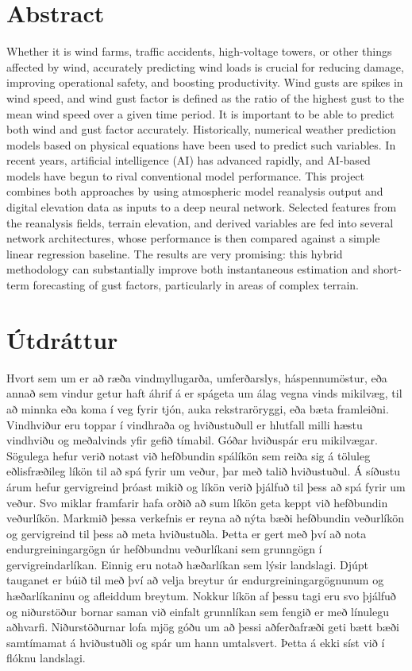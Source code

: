 \documentclass[a4paper,12pt,twoside,BCOR=10mm,openany]{scrbook}
\begin{document}
\section*{Abstract}
Whether it is wind farms, traffic accidents, high-voltage towers, or other things affected by wind, accurately predicting wind loads is crucial for reducing damage, improving operational safety, and boosting productivity. Wind gusts are spikes in wind speed, and wind gust factor is defined as the ratio of the highest gust to the mean wind speed over a given time period. It is important to be able to predict both wind and gust factor accurately. Historically, numerical weather prediction models based on physical equations have been used to predict such variables. In recent years, artificial intelligence (AI) has advanced rapidly, and AI-based models have begun to rival conventional model performance. This project combines both approaches by using atmospheric model reanalysis output and digital elevation data as inputs to a deep neural network. Selected features from the reanalysis fields, terrain elevation, and derived variables are fed into several network architectures, whose performance is then compared against a simple linear regression baseline. The results are very promising: this hybrid methodology can substantially improve both instantaneous estimation and short-term forecasting of gust factors, particularly in areas of complex terrain.
\vfill \vspace*{1cm}

\section*{Útdráttur}
Hvort sem um er að ræða vindmyllugarða, umferðarslys, háspennumöstur, eða annað sem vindur getur haft áhrif á er spágeta um álag vegna vinds mikilvæg, til að minnka eða koma í veg fyrir tjón, auka rekstraröryggi, eða bæta framleiðni. Vindhviður eru toppar í vindhraða og hviðustuðull er hlutfall milli hæstu vindhviðu og meðalvinds yfir gefið tímabil. Góðar hviðuspár eru mikilvægar. Sögulega hefur verið notast við hefðbundin spálíkön sem reiða sig á töluleg eðlisfræðileg líkön til að spá fyrir um veður, þar með talið hviðustuðul. Á síðustu árum hefur gervigreind þróast mikið og líkön verið þjálfuð til þess að spá fyrir um veður. Svo miklar framfarir hafa orðið að sum líkön geta keppt við hefðbundin veðurlíkön. Markmið þessa verkefnis er reyna að nýta bæði hefðbundin veðurlíkön og gervigreind til þess að meta hviðustuðla. Þetta er gert með því að nota endurgreiningargögn úr hefðbundnu veðurlíkani sem grunngögn í gervigreindarlíkan. Einnig eru notað hæðarlíkan sem lýsir landslagi. Djúpt tauganet er búið til með því að velja breytur úr endurgreiningargögnunum og hæðarlíkaninu og afleiddum breytum. Nokkur líkön af þessu tagi eru svo þjálfuð og niðurstöður bornar saman við einfalt grunnlíkan sem fengið er með línulegu aðhvarfi. Niðurstöðurnar lofa mjög góðu um að þessi aðferðafræði geti bætt bæði samtímamat á hviðustuðli og spár um hann umtalsvert. Þetta á ekki síst við í flóknu landslagi.
\end{document}
